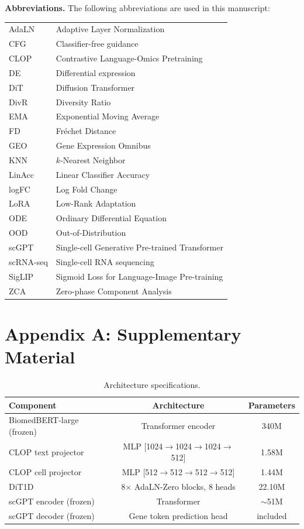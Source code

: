 \documentclass[fleqn,10pt,lineno]{wlpeerj}
\begin{document}
\textbf{Abbreviations.}
The following abbreviations are used in this manuscript:\\[4pt]
\begin{tabular}{@{}ll}
AdaLN & Adaptive Layer Normalization\\
CFG & Classifier-free guidance\\
CLOP & Contrastive Language-Omics Pretraining\\
DE & Differential expression\\
DiT & Diffusion Transformer\\
DivR & Diversity Ratio\\
EMA & Exponential Moving Average\\
FD & Fr\'{e}chet Distance\\
GEO & Gene Expression Omnibus\\
KNN & $k$-Nearest Neighbor\\
LinAcc & Linear Classifier Accuracy\\
logFC & Log Fold Change\\
LoRA & Low-Rank Adaptation\\
ODE & Ordinary Differential Equation\\
OOD & Out-of-Distribution\\
scGPT & Single-cell Generative Pre-trained Transformer\\
scRNA-seq & Single-cell RNA sequencing\\
SigLIP & Sigmoid Loss for Language-Image Pre-training\\
ZCA & Zero-phase Component Analysis
\end{tabular}

\FloatBarrier
\appendix
\section*{Appendix A: Supplementary Material}\label{app:suppl-tables}\label{app:hyperparams}

\begin{table}[!htbp]
\caption{Architecture specifications.\label{tab:architecture}}
\centering
\begin{tabularx}{\textwidth}{lCC}
\toprule
\textbf{Component} & \textbf{Architecture} & \textbf{Parameters} \\
\midrule
BiomedBERT-large (frozen) & Transformer encoder  & 340M \\
CLOP text projector       & MLP [1024$\to$1024$\to$1024$\to$512] & 1.58M \\
CLOP cell projector       & MLP [512$\to$512$\to$512$\to$512]    & 1.44M \\
DiT1D                     & 8$\times$ AdaLN-Zero blocks, 8 heads & 22.10M \\
scGPT encoder (frozen)    & Transformer                          & $\sim$51M \\
scGPT decoder (frozen)    & Gene token prediction head           & included \\
\bottomrule
\end{tabularx}
\end{table}
\end{document}
